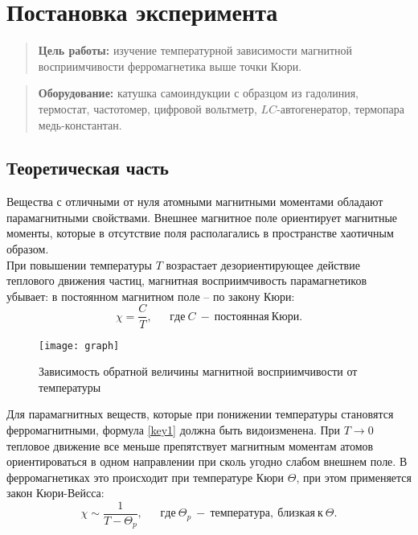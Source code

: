 \documentclass{lab}
\begin{document}


\section*{Постановка эксперимента}

\begin{quote}
\textbf{{\normalsize Цель работы: }}
изучение температурной зависимости магнитной восприимчивости ферромагнетика выше точки Кюри.
\end{quote}

\begin{quote}
\textbf{{\normalsize Оборудование: }}
катушка самоиндукции с образцом из гадолиния, термостат, частотомер, цифровой вольтметр,
$ LC $-автогенератор, термопара медь-константан.
\end{quote}

\subsection*{Теоретическая часть}
\hspace*{\parindent}
Вещества с отличными от нуля атомными магнитными моментами обладают парамагнитными свойствами.
Внешнее магнитное поле ориентирует магнитные моменты, которые в отсутствие поля располагались
в пространстве хаотичным образом.\\
При повышении температуры $ T $ возрастает дезориентирующее действие теплового движения частиц,
магнитная восприимчивость парамагнетиков убывает: в постоянном магнитном поле -- по закону Кюри:
\begin{equation}\label{key1}
\chi = \dfrac{C}{T}, ~~~~~~~ где ~ C ~ - ~ постоянная ~ Кюри.
\end{equation}
\begin{wrapfigure}[12]{r}{3.5cm}
	\vspace{-0.7cm}
	\texttt{[image: graph]}
	\caption{\footnotesize
	Зависимость обратной величины магнитной восприимчивости от температуры
	}
	\label{graph}
\end{wrapfigure}
\hspace*{\parindent}
Для парамагнитных веществ, которые при понижении температуры становятся ферромагнитными, формула
\eqref{key1} должна быть видоизменена. При $ T \rightarrow 0 $ тепловое движение все меньше
препятствует магнитным моментам атомов ориентироваться в одном направлении при сколь угодно
слабом внешнем поле. В ферромагнетиках это происходит при температуре Кюри $ \Theta $, при этом
применяется закон Кюри-Вейсса:
\begin{equation}\label{key2}
\chi \sim \dfrac{1}{T - \Theta_p}, ~~~~~~~ где ~ \Theta_p ~ - ~ температура, ~ близкая ~ к
~ \Theta.
\end{equation}
\end{document}
